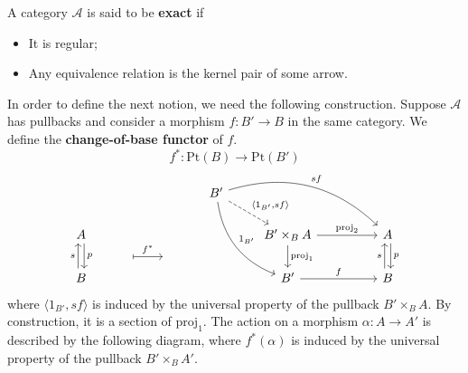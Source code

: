 \begin{mainbox}{}
    \begin{defi}
        A category $\mathcal{A}$ is said to be \textbf{exact} if
        \begin{itemize}
            \item It is regular;
            \item Any equivalence relation is the kernel pair of some arrow.
        \end{itemize}
    \end{defi}
\end{mainbox}
    
In order to define the next notion, we need the following construction. Suppose $\mathcal{A}$ has pullbacks and consider a morphism $f: B' \to B$ in the same category. We define the \textbf{change-of-base functor} of $f$.
\[
f^* : \mathrm{Pt}(B) \to \mathrm{Pt}(B')
\]
\[
\begin{tikzcd}
    &                                             &    & B' \arrow[rd, "{\langle 1_{B'},sf \rangle}", dashed] \arrow[rrrd, "sf", bend left] \arrow[rdd, "1_{B'}", bend right] &                                                                        &  &                              \\
A \arrow[d, "p", shift left] & {} \arrow[r, "f^*", maps to, shift right=7] & {} &                                                                                                                      & B'\times_BA \arrow[rr, "\mathrm{proj}_2"] \arrow[d, "\mathrm{proj}_1"] &  & A \arrow[d, "p", shift left] \\
B \arrow[u, "s", shift left] &                                             &    &                                                                                                                      & B' \arrow[rr, "f"]                                                     &  & B \arrow[u, "s", shift left]
\end{tikzcd}
\]
where $\langle 1_{B'},sf \rangle$ is induced by the universal property of the pullback $B'\times_BA$. By construction, it is a section of $\mathrm{proj}_1$. The action on a morphism $\alpha: A \to A'$ is described by the following diagram, where $f^*(\alpha)$ is induced by the universal property of the pullback $B'\times_BA'$.


